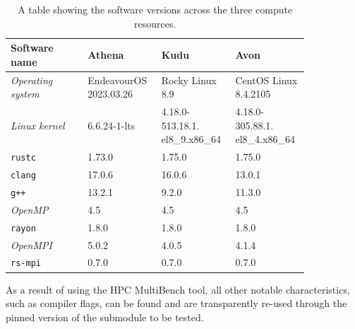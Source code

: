 \begin{table}[H]
    \caption{A table showing the software versions across the three compute resources.}
    \label{table:compute-resource-software-versions}
    \begin{tabular}{|p{0.24\linewidth}||p{0.2\linewidth}|p{0.2\linewidth}|p{0.2\linewidth}|}
    \hline
    \textbf{Software name} & \textbf{Athena} & \textbf{Kudu} & \textbf{Avon} \\
    \hline\hline
    \textit{Operating system} & EndeavourOS 2023.03.26 & Rocky Linux 8.9                & CentOS Linux 8.4.2105          \\\hline
    \textit{Linux kernel}     & 6.6.24-1-lts                     & 4.18.0-513.18.1. el8\_9.x86\_64 & 4.18.0-305.88.1. el8\_4.x86\_64 \\\hline
    \texttt{rustc}            & 1.73.0                           & 1.75.0                         & 1.75.0                         \\\hline
    \texttt{clang}            & 17.0.6                           & 16.0.6                         & 13.0.1                         \\\hline
    \texttt{g++}              & 13.2.1                           & 9.2.0                          & 11.3.0                         \\\hline
    \textit{OpenMP}           & 4.5                              & 4.5                            & 4.5                            \\\hline
    \texttt{rayon}            & 1.8.0                            & 1.8.0                          & 1.8.0                          \\\hline
    \textit{OpenMPI}          & 5.0.2                            & 4.0.5                          & 4.1.4                          \\\hline
    \texttt{rs-mpi}           & 0.7.0                            & 0.7.0                          & 0.7.0                          \\\hline
    \end{tabular}
\end{table}

As a result of using the HPC MultiBench tool, all other notable characteristics, such as compiler flags, can be found and are transparently re-used through the pinned version of the submodule to be tested.


